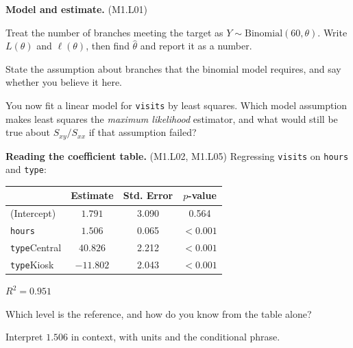 \documentclass[11pt]{article}
\newcommand{\answerspace}[1]{\vspace{#1}}
\newcommand{\lo}[1]{{\normalfont\small (#1)}}
\begin{document}
\begin{questions}

\item \textbf{Model and estimate.} \lo{M1.L01}

\begin{parts}
\item Treat the number of branches meeting the target as $Y \sim \text{Binomial}(60, \theta)$.
Write $L(\theta)$ and $\ell(\theta)$, then find $\hat\theta$ and report it as a number.
\answerspace{5em}

\item State the assumption about branches that the binomial model requires, and say whether you
believe it here.
\answerspace{3.5em}

\item You now fit a linear model for \texttt{visits} by least squares. Which model assumption
makes least squares the \emph{maximum likelihood} estimator, and what would still be true about
$S_{xy}/S_{xx}$ if that assumption failed?
\answerspace{4em}
\end{parts}

\item \textbf{Reading the coefficient table.} \lo{M1.L02, M1.L05} Regressing \texttt{visits} on
\texttt{hours} and \texttt{type}:

\begin{center}
\renewcommand{\arraystretch}{1.2}
\begin{tabular}{lccc}
\toprule
 & \textbf{Estimate} & \textbf{Std. Error} & \textbf{$p$-value} \\
\midrule
(Intercept) & $1.791$ & 3.090 & 0.564 \\
\texttt{hours} & $1.506$ & 0.065 & $<0.001$ \\
\texttt{type}Central & $40.826$ & 2.212 & $<0.001$ \\
\texttt{type}Kiosk & $-11.802$ & 2.043 & $<0.001$ \\
\bottomrule
\end{tabular}
\qquad $R^2 = 0.951$
\end{center}

\begin{parts}
\item Which level is the reference, and how do you know from the table alone?
\answerspace{2.5em}

\item Interpret $1.506$ in context, with units and the conditional phrase.
\answerspace{3.5em}


\end{parts}
\end{questions}
\end{document}
